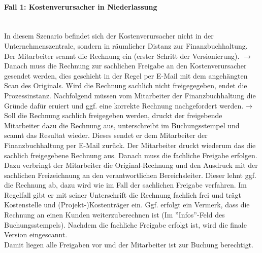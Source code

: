 \paragraph{Fall 1: Kostenverursacher in Niederlassung}
~\\ 
In diesem Szenario befindet sich der Kostenverursacher nicht in der Unternehmenszentrale, sondern in räumlicher Distanz zur Finanzbuchhaltung.\\
Der Mitarbeiter scannt die Rechnung ein (erster Schritt der Versionierung). $\rightarrow$
Danach muss die Rechnung zur sachlichen Freigabe an den Kostenverursacher gesendet werden, dies geschieht in der Regel per E-Mail mit dem angehängten Scan des Originals.
Wird die Rechnung sachlich nicht freigegegeben, endet die Prozessinstanz.
Nachfolgend müssen vom Mitarbeiter der Finanzbuchhaltung die Gründe dafür eruiert und ggf. eine korrekte Rechnung nachgefordert werden.$\rightarrow$
Soll die Rechnung sachlich freigegeben werden, druckt der freigebende Mitarbeiter dazu die Rechnung aus, unterschreibt im Buchungsstempel und scannt das Resultat wieder.
Dieses sendet er dem Mitarbeiter der Finanzbuchhaltung per E-Mail zurück.
Der Mitarbeiter druckt wiederum das die sachlich freigegebene Rechnung aus.
Danach muss die fachliche Freigabe erfolgen.
Dazu verbringt der Mitarbeiter die Original-Rechnung und den Ausdruck mit der sachlichen Freizeichnung an den verantwortlichen Bereichsleiter.
Dieser lehnt ggf. die Rechnung ab, dazu wird wie im Fall der sachlichen Freigabe verfahren.
Im Regelfall gibt er mit seiner Unterschrift die Rechnung fachlich frei und trägt Kostenstelle und (Projekt-)Kostenträger ein.
Ggf. erfolgt ein Vermerk, dass die Rechnung an einen Kunden weiterzuberechnen ist (Im ''Infos''-Feld des Buchungsstempels). 
Nachdem die fachliche Freigabe erfolgt ist, wird die finale Version eingescannt.\\
Damit liegen alle Freigaben vor und der Mitarbeiter ist zur Buchung berechtigt.

